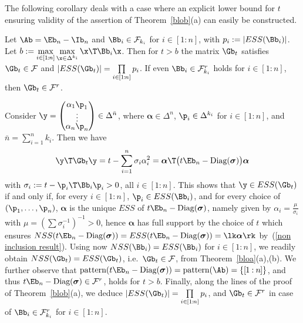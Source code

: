 \documentclass[moor]{informs3}              %
\def\reff#1{(\ref{#1})}
\def\irg#1#2{{ \in\! [{#1}\! : \! {#2}]}}
\def\sirg#1#2{{ \in\kern-.5pt [{#1}\kern-.5pt : \kern-.5pt {#2}]}}
\def\rg#1#2{{ [\kern-.5pt{#1}\kern-.5pt : \kern-.5pt {#2}\kern-.5pt]}}
\begin{document}
The following corollary deals with a case where an explicit lower bound for $t$ ensuring validity of the assertion of Theorem~\ref{blob}(a) can easily be constructed.
\begin{cly}\label{corb}
Let $\Ab=\Eb_n-\Ib_n$ and $\Bb_i\in\mathcal{F}_{k_i}$ for $i\irg 1n$, with $p_i:=|ESS(\Bb_i)|$. Let
$b:=\max\limits_{i\sirg 1n}\max\limits_{\x\in\Delta^{k_i}}\x\T\Bb_i\x$. Then for $t>b$ the matrix $\Gb_t$ satisfies $\Gb_t\in\mathcal{F}$ and $|ESS(\Gb_t)|=\prod\limits_{i{\sirg 1n}}p_i$. If even $\Bb_i\in\mathcal{F}^r_{k_i}$ holds for $i\irg 1n$, then $\Gb_t\in\mathcal{F}^r$.
\end{cly}
\bep
Consider $\y=\renewcommand*{\arraystretch}{.5}\begin{pmatrix}\alpha_1\p_1 \\ \vdots \\ \alpha_n\p_n \end{pmatrix}\in\Delta^{\bar n}$, where $\bm{\alpha}\in\Delta^n$, $\p_i\in\Delta^{k_i}$ for $i\irg 1n$, and $\bar n=\sum_{i=1}^nk_i$.
Then we have
\begin{equation}\label{e:cor1}
\y\T\Gb_t\y=t-\sum_{i=1}^{n}\sigma_i\alpha_i^2=\bm{\alpha}\T\big(t\Eb_n-\textup{Diag}(\bm{\sigma})\big)\bm{\alpha}
\end{equation}
with $\sigma_i:= t-\p_i\T\Bb_i\p_i >0$, all $i\irg 1n$.
This shows that $\y\in ESS(\Gb_t)$ if and only if, for every $i\irg 1n$,
$\p_i\in ESS(\Bb_i)$, and for every choice of $(\p_1,\ldots,\p_n)$,
$\bm{\alpha}$ is the unique $ESS$ of $t\Eb_n-\textup{Diag}(\bm{\sigma})$, namely given by $\alpha_i = \frac \mu{\sigma_i}$ with $\mu=(\sum \sigma_i^{-1})^{-1}>0$, hence $\bm{\alpha}$ has full support by the choice of $t$  which ensures $NSS(t\Eb_n-\textup{Diag}(\bm{\sigma}))=ESS(t\Eb_n-\textup{Diag}(\bm{\sigma}))= \lk \bm{\alpha}\rk$ by~\reff{non inclusion result}.
Using now $NSS(\Bb_i)=ESS(\Bb_i)$ for $i\irg 1n$, we readily obtain $NSS(\Gb_t)=ESS(\Gb_t)$, i.e.~$\Gb_t\in \mathcal{F}$, from Theorem~\ref{bloa}(a),(b). We further observe that $\textup{pattern}(t\Eb_n-\textup{Diag}(\bm{\sigma}))=\textup{pattern}(\Ab)=\{\rg 1n\}$, and thus $t\Eb_n-\textup{Diag}(\bm{\sigma})\in\mathcal{F}^r$, holds for $t>b$. Finally, along the lines
of the proof of Theorem~\ref{blob}(a), we deduce $|ESS(\Gb_t)|=\prod\limits_{i{\sirg 1n}}p_i$, and $\Gb_t\in \mathcal{F}^r$ in case of $\Bb_i\in\mathcal{F}^r_{k_i}$ for $i\irg 1n$.
\ep
\end{document}
